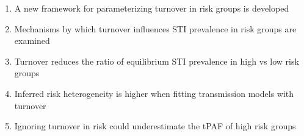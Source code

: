 \begin{enumerate}
  \item A new framework for parameterizing turnover in risk groups is developed
  \item Mechanisms by which turnover influences STI prevalence in risk groups are examined
  \item Turnover reduces the ratio of equilibrium STI prevalence in high vs low risk groups
  \item Inferred risk heterogeneity is higher when fitting transmission models with turnover
  \item Ignoring turnover in risk could underestimate the tPAF of high risk groups
\end{enumerate}